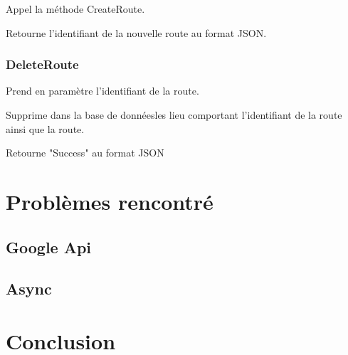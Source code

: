 \documentclass[a4paper]{article}
\newcommand{\rpi}{\emph{Raspbery Pi}}
\newcommand{\bdd}{base de données}
\begin{document}
Appel la méthode CreateRoute.

Retourne l'identifiant de la nouvelle route au format JSON.

\subsubsection{DeleteRoute}
Prend en paramètre l'identifiant de la route.

Supprime dans la \bdd les lieu comportant l'identifiant de la route ainsi que la route.

Retourne "Success" au format JSON

\pagebreak

\section{Problèmes rencontré}
\subsection{Google Api}
\subsection{Async}

\section{Conclusion}

\pagebreak



\listoffigures
\end{document}
